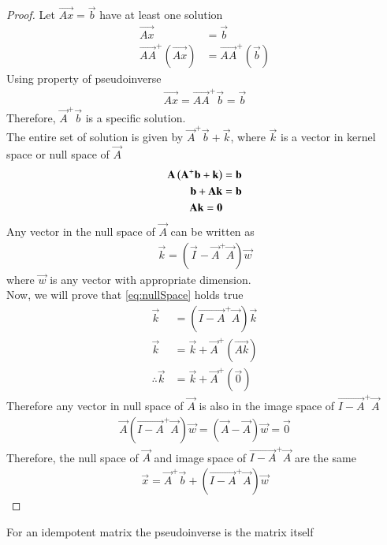 \documentclass[journal,12pt,twocolumn]{IEEEtran}
\begin{document}
\begin{proof}
Let $\vec{Ax}=\vec{b}$ have at least one solution
\begin{align}
    \vec{Ax}&=\vec{b}\\
    \vec{AA}^+(\vec{Ax})&=\vec{AA}^+(\vec{b})
\end{align}
Using property of pseudoinverse
\begin{align}
    \vec{Ax}=\vec{AA}^+\vec{b}=\vec{b}
\end{align}
Therefore, $\vec{A}^+\vec{b}$ is a specific solution.\\
The entire set of solution is given by $\vec{A}^+\vec{b}+\vec{k}$, where $\vec{k}$ is a vector in kernel space or null space of $\vec{A}$
\begin{align}
    \mathbf{A}\left(\mathbf{A}^+\mathbf{b}+\mathbf{k}\right)&=\mathbf{b}\\
    \mathbf{b}+\mathbf{Ak}&=\mathbf{b}\\
    \mathbf{Ak}=\mathbf{0}
\end{align}
Any vector in the null space of $\vec{A}$ can be written as
\begin{align}
    \vec{k}=(\vec{I}-\vec{A}^+\vec{A})\vec{w} \label{eq:nullSpace}
\end{align}
where $\vec{w}$ is any vector with appropriate dimension.\\
Now, we will prove that \eqref{eq:nullSpace} holds true
\begin{align}
    \vec{k}&=(\vec{I-A}^+\vec{A})\vec{k}\\
    \vec{k}&=\vec{k}+\vec{A}^+(\vec{Ak})\\
    \therefore \vec{k}&=\vec{k}+\vec{A}^+(\vec{0})
\end{align}
Therefore any vector in null space of $\vec{A}$ is also in the image space of $ \vec{I-A}^+\vec{A} $
\begin{align}
    \vec{A}(\vec{I-A}^+\vec{A})\vec{w}=(\vec{A}-\vec{A})\vec{w}=\vec{0}
\end{align}
Therefore, the null space of $\vec{A}$ and image space of $\vec{I-A}^+\vec{A}$ are the same
\begin{align}
    \vec{x}=\vec{A}^+\vec{b}+(\vec{I-A}^+\vec{A})\vec{w}
\end{align}
\end{proof}
\begin{lemma}
\label{lemma:pseudoinverse}
    For an idempotent matrix the pseudoinverse is the matrix itself
\end{lemma}
\end{document}
